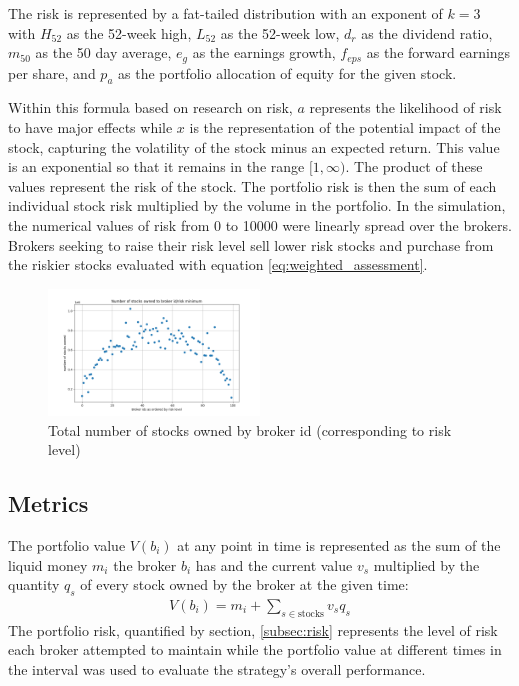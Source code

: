 \documentclass[letterpaper, 11 pt, proceedings]{IEEEtran}
\begin{document}
	The risk is represented by a fat-tailed distribution with an exponent of $k=3$ with $H_{52}$ as the 52-week high, $L_{52}$ as the 52-week low, $d_r$ as the dividend ratio, $m_{50}$ as the 50 day average, $e_g$ as the earnings growth, $f_{eps}$ as the forward earnings per share, and $p_a$ as the portfolio allocation of equity for the given stock. 
	
	Within this formula based on research on risk, $a$ represents the likelihood of risk to have major effects while $x$ is the representation of the potential impact of the stock, capturing the volatility of the stock minus an expected return. This value is an exponential so that it remains in the range $[1, \infty)$.
	The product of these values represent the risk of the stock. The portfolio risk is then the sum of each individual stock risk multiplied by the volume in the portfolio. In the simulation, the numerical values of risk from 0 to 10000 were linearly spread over the brokers. Brokers seeking to raise their risk level sell lower risk stocks and purchase from the riskier stocks evaluated with equation \ref{eq:weighted_assessment}.

	\begin{figure}[h]
		\centering
		\includegraphics[width=0.5\textwidth]{stocksOwnedToBrokerIds.png}
		\caption{Total number of stocks owned by broker id (corresponding to risk level)}
		\label{totalvID}
	\end{figure}
	
		
	\subsection{Metrics}\label{subsec:metrics}	
	The portfolio value $V(b_i)$ at any point in time is represented as the sum of the liquid money $m_i$ the broker $b_i$ has and the current value $v_s$ multiplied by the quantity $q_s$ of every stock owned by the broker at the given time: 
	\begin{align}
		V(b_i) = m_i + \sum\limits_{s\in\text{stocks}} v_s q_s\label{eq:portfolio_value}
	\end{align}
	The portfolio risk, quantified by section, \ref{subsec:risk} represents the level of risk each broker attempted to maintain while the portfolio value at different times in the interval was used to evaluate the strategy's overall performance.
\end{document}
